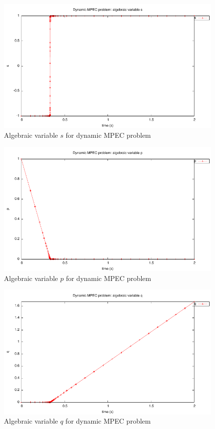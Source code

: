 \documentclass[a4paper,11pt]{report}    %
\begin{document}
\begin{figure}
  \centering
  \includegraphics{../examples/mpec/s}
  \caption{Algebraic variable $s$ for dynamic MPEC problem}
 \label{fig:mpec_s}
\end{figure}

\begin{figure}
  \centering
  \includegraphics{../examples/mpec/p}
  \caption{Algebraic variable $p$ for dynamic MPEC problem}
 \label{fig:mpec_p}
\end{figure}

\begin{figure}
  \centering
  \includegraphics{../examples/mpec/q}
  \caption{Algebraic variable $q$ for dynamic MPEC problem}
 \label{fig:mpec_q}
\end{figure}
\end{document}
